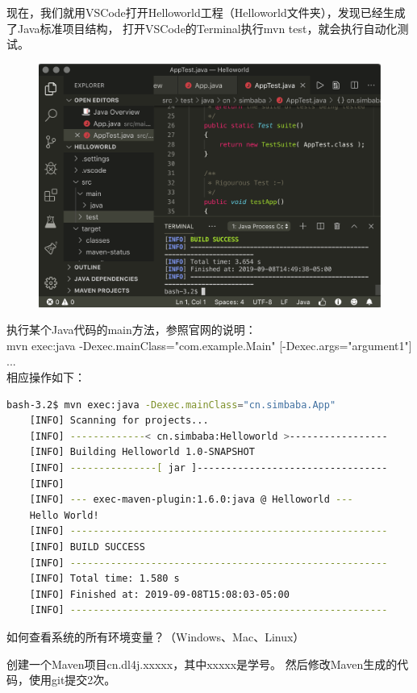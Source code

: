 现在，我们就用VSCode打开Helloworld工程（Helloworld文件夹），发现已经生成了Java标准项目结构，
打开VSCode的Terminal执行mvn test，就会执行自动化测试。

\begin{figure}[!htb]
	\centerline{\includegraphics[width=\textwidth]{part1/mvn-vscode.png}}
\end{figure}

\noindent
执行某个Java代码的main方法，参照官网的说明：\\
mvn exec:java -Dexec.mainClass="com.example.Main" [-Dexec.args="argument1"] ...\\
相应操作如下：
\begin{lstlisting}[language=bash, backgroundcolor=\color{lightgray!10}]
	bash-3.2$ mvn exec:java -Dexec.mainClass="cn.simbaba.App"
	[INFO] Scanning for projects...
	[INFO] -------------< cn.simbaba:Helloworld >-----------------
	[INFO] Building Helloworld 1.0-SNAPSHOT
	[INFO] ---------------[ jar ]---------------------------------
	[INFO] 
	[INFO] --- exec-maven-plugin:1.6.0:java @ Helloworld ---
	Hello World!
	[INFO] -------------------------------------------------------
	[INFO] BUILD SUCCESS
	[INFO] -------------------------------------------------------
	[INFO] Total time: 1.580 s
	[INFO] Finished at: 2019-09-08T15:08:03-05:00
	[INFO] -------------------------------------------------------
\end{lstlisting}
\bigskip

\begin{exercise}
	如何查看系统的所有环境变量？（Windows、Mac、Linux）
\end{exercise}

\begin{exercise}
	创建一个Maven项目cn.dl4j.xxxxx，其中xxxxx是学号。
	然后修改Maven生成的代码，使用git提交2次。
\end{exercise}